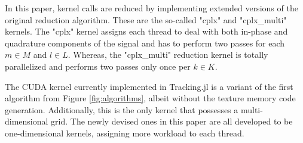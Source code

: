 \documentclass{juliacon}
\begin{document}
In this paper, kernel calls are reduced by implementing extended versions of the original reduction algorithm. These are the so-called "cplx" and "cplx\_multi" kernels. The "cplx" kernel assigns each thread to deal with both in-phase and quadrature components of the signal and has to perform two passes for each $m \in M$ and $l \in L$. Whereas, the "cplx\_multi" reduction kernel is totally parallelized and performs two passes only once per $k \in K$.

The CUDA kernel currently implemented in Tracking.jl is a variant of the first algorithm from Figure \ref{fig:algorithms}, albeit without the texture memory code generation. Additionally, this is the only kernel that possesses a multi-dimensional grid. The newly devised ones in this paper are all developed to be one-dimensional kernels, assigning more workload to each thread.

    


\end{document}
